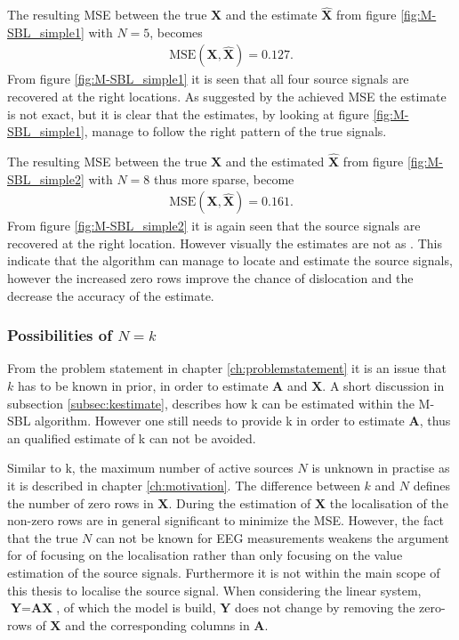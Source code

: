 \noindent
The resulting MSE between the true $\mathbf{X}$ and the estimate $\hat{\mathbf{X}}$ from figure \ref{fig:M-SBL_simple1} with $N = 5$, becomes 
\begin{align*}
\text{MSE}(\mathbf{X}, \hat{\mathbf{X}}) = 0.127.
\end{align*}
From figure \ref{fig:M-SBL_simple1} it is seen that all four source signals are recovered at the right locations. 
As suggested by the achieved MSE the estimate is not exact, but it is clear that the estimates, by looking at figure \ref{fig:M-SBL_simple1}, manage to follow the right pattern of the true signals. 

The resulting MSE between the true $\mathbf{X}$ and the estimated $\hat{\mathbf{X}}$ from figure \ref{fig:M-SBL_simple2} with $N = 8$ thus more sparse, become 
\begin{align*}
\text{MSE}(\mathbf{X}, \hat{\mathbf{X}}) = 0.161. 
\end{align*}
From figure \ref{fig:M-SBL_simple2} it is again seen that the source signals are recovered at the right location. However visually the estimates are not as .  
This indicate that the algorithm can manage to locate and estimate the source signals, however the increased zero rows improve the chance of dislocation and the decrease the accuracy of the estimate.     

\subsubsection*{Possibilities of $N=k$}

From the problem statement in chapter \ref{ch:problemstatement} it is an issue that $k$ has to be known in prior, in order to estimate $\textbf{A}$ and $\textbf{X}$. A short discussion in subsection \ref{subsec:kestimate}, describes how k can be estimated within the M-SBL algorithm. However one still needs to provide k in order to estimate $\textbf{A}$, thus an qualified estimate of k can not be avoided. 

Similar to k, the maximum number of active sources $N$ is unknown in practise as it is described in chapter \ref{ch:motivation}. 
The difference between $k$ and $N$ defines the number of zero rows in $\textbf{X}$.
During the estimation of $\textbf{X}$ the localisation of the non-zero rows are in general significant to minimize the MSE. However, the fact that the true $N$ can not be known for EEG measurements weakens the argument for of focusing on the localisation rather than only focusing on the value estimation of the source signals. Furthermore it is not within the main scope of this thesis to localise the source signal.  
When considering the linear system, $\textbf{Y}=\textbf{AX}$, of which the model is build, $\textbf{Y}$ does not change by removing the zero-rows of $\textbf{X}$ and the corresponding columns in $\textbf{A}$.
 
